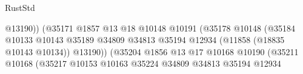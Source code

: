 \begin{lexlean}{RustStd}
\begin{coremodule}
                                                                  @13190))
                                                              (@35171
                                                                @1857
                                                                @13
                                                                @18
                                                                @10148
                                                                @10191
                                                                (@35178
                                                                  @10148
                                                                  (@35184
                                                                    @10133
                                                                    @10143
                                                                    @35189
                                                                    @34809
                                                                    @34813
                                                                    @35194
                                                                    @12934
                                                                    (@11858 (@18835 @10143 @10134))
                                                                    @13190))
                                                                (@35204
                                                                  @1856
                                                                  @13
                                                                  @17
                                                                  @10168
                                                                  @10190
                                                                  (@35211
                                                                    @10168
                                                                    (@35217
                                                                      @10153
                                                                      @10163
                                                                      @35224
                                                                      @34809
                                                                      @34813
                                                                      @35194
                                                                      @12934

\end{coremodule}
\end{lexlean}
